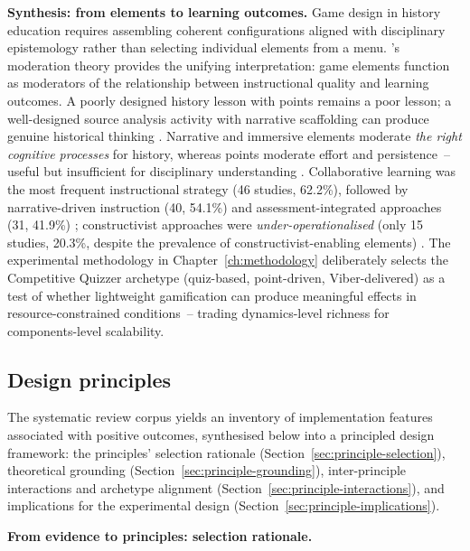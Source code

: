 \textbf{Synthesis: from elements to learning outcomes.} Game design in history education requires assembling coherent configurations aligned with disciplinary epistemology rather than selecting individual elements from a menu. \citeauthor{Landers2014}'s~\cite{Landers2014} moderation theory provides the unifying interpretation: game elements function as moderators of the relationship between instructional quality and learning outcomes. A poorly designed history lesson with points remains a poor lesson; a well-designed source analysis activity with narrative scaffolding can produce genuine historical thinking \cite{Werbach2012, Toda2019, KorniienkoSemerikov2024}. Narrative and immersive elements moderate \textit{the right cognitive processes} for history, whereas points moderate effort and persistence~-- useful but insufficient for disciplinary understanding \cite{Korniienko2025aredu}. Collaborative learning was the most frequent instructional strategy (46 studies, 62.2\%), followed by narrative-driven instruction (40, 54.1\%) and assessment-integrated approaches (31, 41.9\%) \cite{3Watson2011466, 12Gilbert2019108, 19Chou2019}; constructivist approaches were \textit{under-operationalised} (only 15 studies, 20.3\%, despite the prevalence of constructivist-enabling elements) \cite{Constructivism}. The experimental methodology in Chapter~\ref{ch:methodology} deliberately selects the Competitive Quizzer archetype (quiz-based, point-driven, Viber-delivered) as a test of whether lightweight gamification can produce meaningful effects in resource-constrained conditions~-- trading dynamics-level richness for components-level scalability.

\subsection{Design principles} \label{sec:design-principles}

The systematic review corpus \cite{KorniienkoSemerikov2024} yields an inventory of implementation features associated with positive outcomes, synthesised below into a principled design framework: the principles' selection rationale (Section~\ref{sec:principle-selection}), theoretical grounding (Section~\ref{sec:principle-grounding}), inter-principle interactions and archetype alignment (Section~\ref{sec:principle-interactions}), and implications for the experimental design (Section~\ref{sec:principle-implications}).

\textbf{From evidence to principles: selection rationale.} \label{sec:principle-selection}

